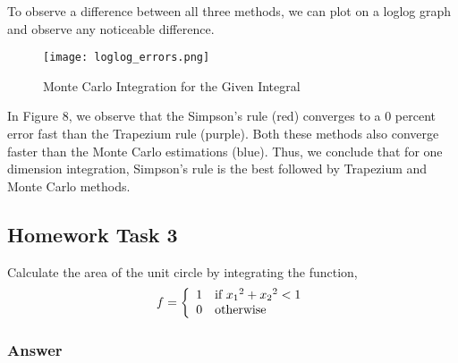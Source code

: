 \documentclass[12pt]{article}
\begin{document}
To observe a difference between all three methods, we can plot on a loglog graph and observe any noticeable difference. 

\begin{figure}[h!]
  \texttt{[image: loglog\_errors.png]}
  \caption{Monte Carlo Integration for the Given Integral}
  \label{fig:mc_randomness}
\end{figure}

In Figure 8, we observe that the Simpson's rule (red) converges to a 0 percent error fast than the Trapezium rule (purple). Both these methods also converge faster than the Monte Carlo estimations (blue). Thus, we conclude that for one dimension integration, Simpson's rule is the best followed by Trapezium and Monte Carlo methods. 

\subsection*{Homework Task 3}

Calculate the area of the unit circle by integrating the function,
\begin{align}
f =
\left\{
	\begin{array}{ll}
		1  & \mbox{if } x\textsubscript{1}^2 + x\textsubscript{2}^2 < 1 \\
		0 & \mbox{otherwise}
	\end{array}
\right.
\end{align}

\subsubsection*{Answer}
\end{document}
